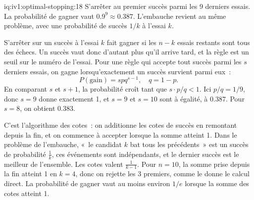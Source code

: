 \begin{solution}{iq:iv1:optimal-stopping:18}
S'arrêter au premier succès parmi les 9 derniers essais. La probabilité de gagner vaut $0.9^9 \approx 0.387$. L'embauche revient au même problème, avec une probabilité de succès $1/k$ à l'essai $k$.

S'arrêter sur un succès à l'essai $k$ fait gagner si les $n - k$ essais restants sont tous des échecs. Un succès vaut donc d'autant plus qu'il arrive tard, et la règle est un seuil sur le numéro de l'essai. Pour une règle qui accepte tout succès parmi les $s$ derniers essais, on gagne lorsqu'exactement un succès survient parmi eux~:
\[
P(\text{gain}) = s p q^{s - 1},\quad q = 1 - p.
\]
En comparant $s$ et $s + 1$, la probabilité croît tant que $s \cdot p/q < 1$. Ici $p/q = 1/9$, donc $s = 9$ donne exactement 1, et $s = 9$ et $s = 10$ sont à égalité, à $0.387$. Pour $s = 8$, on obtient $0.383$.

C'est l'algorithme des cotes~: on additionne les cotes de succès en remontant depuis la fin, et on commence à accepter lorsque la somme atteint 1. Dans le problème de l'embauche, «~le candidat $k$ bat tous les précédents~» est un succès de probabilité $\frac1k$, ces événements sont indépendants, et le dernier succès est le meilleur de l'ensemble. Les cotes valent $\frac{1}{k - 1}$. Pour $n = 10$, la somme prise depuis la fin atteint 1 en $k = 4$, donc on rejette les 3 premiers, comme le donne le calcul direct. La probabilité de gagner vaut au moins environ $1/e$ lorsque la somme des cotes atteint 1.

\end{solution}

